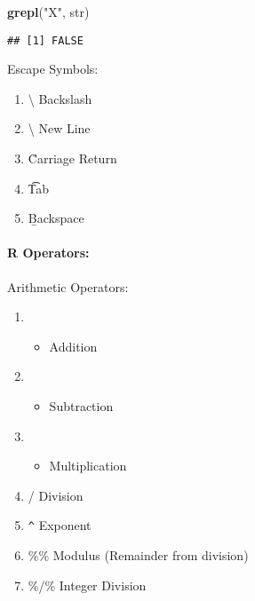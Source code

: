 \documentclass[
]{article}
\newenvironment{Shaded}{\begin{snugshade}}{\end{snugshade}}
\newcommand{\FunctionTok}[1]{\textcolor[rgb]{0.13,0.29,0.53}{\textbf{#1}}}
\newcommand{\NormalTok}[1]{#1}
\newcommand{\StringTok}[1]{\textcolor[rgb]{0.31,0.60,0.02}{#1}}
\providecommand{\tightlist}{%
  \setlength{\itemsep}{0pt}\setlength{\parskip}{0pt}}
\begin{document}
\begin{Shaded}
\begin{Highlighting}[]
\FunctionTok{grepl}\NormalTok{(}\StringTok{"X"}\NormalTok{, str)}
\end{Highlighting}
\end{Shaded}

\begin{verbatim}
## [1] FALSE
\end{verbatim}

Escape Symbols:

\begin{enumerate}
\def\labelenumi{\arabic{enumi}.}
\tightlist
\item
  \textbackslash{} Backslash
\item
  \textbackslash{} New Line
\item
  \r   Carriage Return
\item
  \t   Tab
\item
  \b   Backspace
\end{enumerate}

\hypertarget{r-operators}{%
\paragraph{R Operators:}\label{r-operators}}

Arithmetic Operators:

\begin{enumerate}
\def\labelenumi{\arabic{enumi}.}
\item
  \begin{itemize}
  \tightlist
  \item
    Addition
  \end{itemize}
\item
  \begin{itemize}
  \tightlist
  \item
    Subtraction
  \end{itemize}
\item
  \begin{itemize}
  \tightlist
  \item
    Multiplication\\
  \end{itemize}
\item
  / Division\\
\item
  \texttt{\^{}} Exponent\\
\item
  \%\% Modulus (Remainder from division)\\
\item
  \%/\% Integer Division
\end{enumerate}
\end{document}
